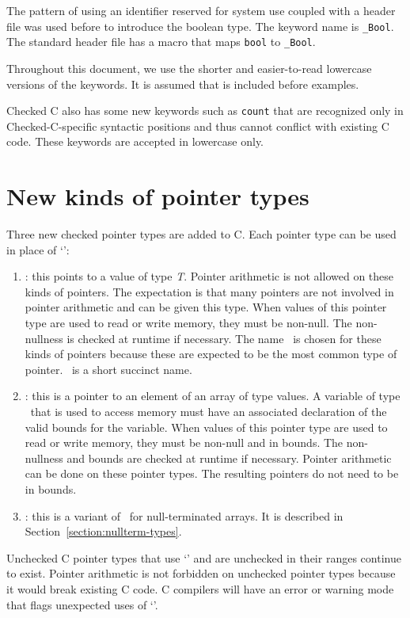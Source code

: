 The pattern of using an identifier reserved for system use coupled with
a header file was used before to introduce the boolean type. The keyword
name is \lstinline+_Bool+.  The standard header file 
has a macro that maps \lstinline+bool+ to \lstinline+_Bool+.

Throughout this document, we use the shorter and easier-to-read
lowercase versions of the keywords.  It is assumed
that  is included before examples.

Checked C also has some new keywords such as \lstinline+count+ that are
recognized only in Checked-C-specific syntactic positions and thus
cannot conflict with existing C code. These keywords are accepted in
lowercase only.

\section{New kinds of pointer types}
Three new checked pointer types are added to C. Each pointer type can be
used in place of `\code{*}':
\begin{enumerate}
\item
  \ptrT: this points to
  a value of type \textit{T}. Pointer arithmetic is not allowed on these
  kinds of pointers. The expectation is that many pointers are not
  involved in pointer arithmetic and can be given this type. When
  values of this pointer type are used to read or write memory, they
  must be non-null. The non-nullness is checked at runtime if necessary.
  The name \ptr\ is chosen for these kinds of pointers because these
  are expected to be the most common type of pointer. \ptr\
  is a short succinct name.
\item
  \arrayptrT: this is
  a pointer to an element of an array of type  values. A
  variable of type \arrayptr\ that is used to access memory
  must have an associated declaration of the valid bounds for the
  variable. When values of this pointer type are used to read or write
  memory, they must be non-null and in bounds. The non-nullness and
  bounds are checked at runtime if necessary. Pointer arithmetic can be
  done on these pointer types. The resulting pointers do not need to be
  in bounds.
\item
 \ntarrayptrT: this is a variant of \arrayptrT\ for null-terminated
 arrays.  It is described in Section~\ref{section:nullterm-types}.
\end{enumerate}

Unchecked C pointer types that use `\code{*}' and are unchecked in their
ranges continue to exist. Pointer arithmetic is not forbidden on unchecked
pointer types because it would break existing C code. C compilers will
have an error or warning mode that flags unexpected uses of `\code{*}'.

